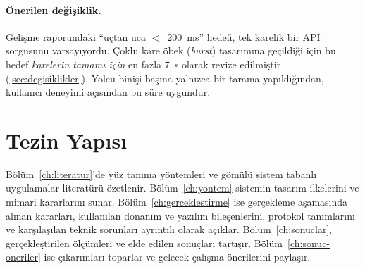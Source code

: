 \paragraph{Önerilen değişiklik.} Gelişme raporundaki ``uçtan uca
$<$~200~ms'' hedefi, tek karelik bir API sorgusunu varsayıyordu. Çoklu
kare öbek (\emph{burst}) tasarımına geçildiği için bu hedef
\emph{karelerin tamamı için} en fazla 7~s olarak revize edilmiştir
(\ref{sec:degisiklikler}). Yolcu binişi başına yalnızca bir tarama
yapıldığından, kullanıcı deneyimi açısından bu süre uygundur.

\section{Tezin Yapısı}

Bölüm~\ref{ch:literatur}'de yüz tanıma yöntemleri ve gömülü sistem tabanlı
uygulamalar literatürü özetlenir. Bölüm~\ref{ch:yontem} sistemin tasarım
ilkelerini ve mimari kararlarını sunar. Bölüm~\ref{ch:gerceklestirme} ise
gerçekleme aşamasında alınan kararları, kullanılan donanım ve yazılım
bileşenlerini, protokol tanımlarını ve karşılaşılan teknik sorunları
ayrıntılı olarak açıklar. Bölüm~\ref{ch:sonuclar}, gerçekleştirilen
ölçümleri ve elde edilen sonuçları tartışır. Bölüm~\ref{ch:sonuc-oneriler}
ise çıkarımları toparlar ve gelecek çalışma önerilerini paylaşır.
